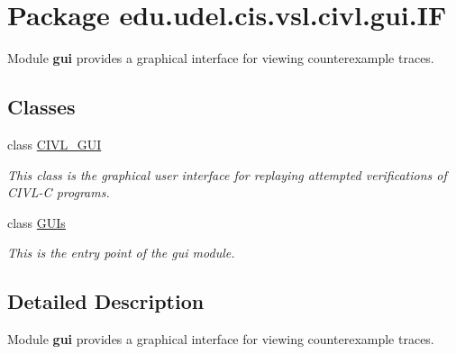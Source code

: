 \hypertarget{namespaceedu_1_1udel_1_1cis_1_1vsl_1_1civl_1_1gui_1_1IF}{}\section{Package edu.\+udel.\+cis.\+vsl.\+civl.\+gui.\+I\+F}
\label{namespaceedu_1_1udel_1_1cis_1_1vsl_1_1civl_1_1gui_1_1IF}


Module {\bfseries gui} provides a graphical interface for viewing counterexample traces.  


\subsection*{Classes}
\begin{DoxyCompactItemize}
\item 
class \hyperlink{classedu_1_1udel_1_1cis_1_1vsl_1_1civl_1_1gui_1_1IF_1_1CIVL__GUI}{C\+I\+V\+L\+\_\+\+G\+U\+I}
\begin{DoxyCompactList}\small\item\em This class is the graphical user interface for replaying attempted verifications of C\+I\+V\+L-\/\+C programs. \end{DoxyCompactList}\item 
class \hyperlink{classedu_1_1udel_1_1cis_1_1vsl_1_1civl_1_1gui_1_1IF_1_1GUIs}{G\+U\+Is}
\begin{DoxyCompactList}\small\item\em This is the entry point of the gui module. \end{DoxyCompactList}\end{DoxyCompactItemize}


\subsection{Detailed Description}
Module {\bfseries gui} provides a graphical interface for viewing counterexample traces. 